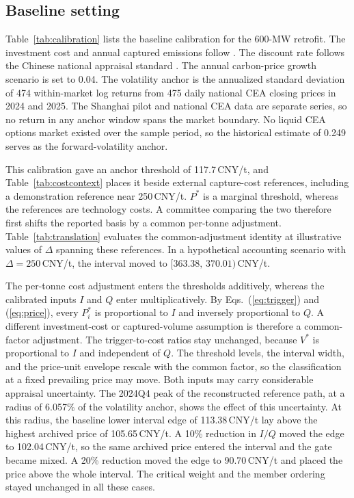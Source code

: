 \subsection{Baseline setting}

Table~\ref{tab:calibration} lists the baseline calibration for the 600-MW retrofit. The investment cost and annual captured emissions follow \citet{Sun2024}. The discount rate follows the Chinese national appraisal standard \citep{NDRC2006}. The annual carbon-price growth scenario is set to 0.04. The volatility anchor is the annualized standard deviation of 474 within-market log returns from 475 daily national CEA closing prices in 2024 and 2025. The Shanghai pilot and national CEA data are separate series, so no return in any anchor window spans the market boundary. No liquid CEA options market existed over the sample period, so the historical estimate of 0.249 serves as the forward-volatility anchor.

This calibration gave an anchor threshold of 117.7\,CNY/t, and Table~\ref{tab:costcontext} places it beside external capture-cost references, including a demonstration reference near 250\,CNY/t. $P^{*}$ is a marginal threshold, whereas the references are technology costs. A committee comparing the two therefore first shifts the reported basis by a common per-tonne adjustment. Table~\ref{tab:translation} evaluates the common-adjustment identity at illustrative values of $\Delta$ spanning these references. In a hypothetical accounting scenario with $\Delta=250$\,CNY/t, the interval moved to $[363.38,\,370.01)$\,CNY/t.

The per-tonne cost adjustment enters the thresholds additively, whereas the calibrated inputs $I$ and $Q$ enter multiplicatively. By Eqs.~(\ref{eq:trigger}) and (\ref{eq:price}), every $P^{*}_{i}$ is proportional to $I$ and inversely proportional to $Q$. A different investment-cost or captured-volume assumption is therefore a common-factor adjustment. The trigger-to-cost ratios stay unchanged, because $V^{*}$ is proportional to $I$ and independent of $Q$. The threshold levels, the interval width, and the price-unit envelope rescale with the common factor, so the classification at a fixed prevailing price may move. Both inputs may carry considerable appraisal uncertainty. The 2024Q4 peak of the reconstructed reference path, at a radius of 6.057\% of the volatility anchor, shows the effect of this uncertainty. At this radius, the baseline lower interval edge of 113.38\,CNY/t lay above the highest archived price of 105.65\,CNY/t. A 10\% reduction in $I/Q$ moved the edge to 102.04\,CNY/t, so the same archived price entered the interval and the gate became mixed. A 20\% reduction moved the edge to 90.70\,CNY/t and placed the price above the whole interval. The critical weight and the member ordering stayed unchanged in all these cases.


